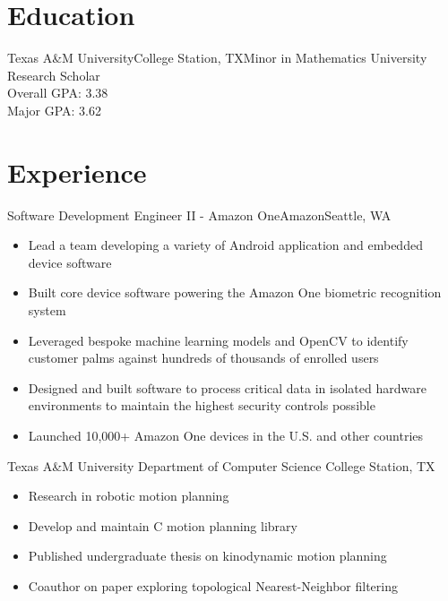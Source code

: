 \documentclass[11pt,a4paper,sans]{moderncv}
\newcommand{\Rplus}{\protect\hspace{-.1em}\protect\raisebox{.35ex}{\smaller{\smaller\textbf{+}}}}
\newcommand{\Cpp}{\mbox{C\Rplus\Rplus}\xspace}
\newcommand{\spacing}{4pt}
\begin{document}
\makecvtitle

\vspace{-1em}


\section{Education}

\vspace{\spacing}

    {Texas A\&M University}{College Station, TX}{Minor in Mathematics}
    {University Research Scholar \\ Overall GPA: 3.38 \\ Major GPA: 3.62}

\section{Experience}

\vspace{\spacing}

  {Software Development Engineer II - Amazon One}{Amazon}{Seattle, WA}{}
    {\vspace{3pt}
    \begin{itemize}
      \item Lead a team developing a variety of Android application and embedded device software
      \item Built core device software powering the Amazon One biometric recognition system
      \item Leveraged bespoke machine learning models and OpenCV to identify customer palms against hundreds of thousands of enrolled users
      \item Designed and built software to process critical data in isolated hardware environments to maintain the highest security controls possible
      \item Launched 10,000+ Amazon One devices in the U.S. and other countries
    \end{itemize}
    }

\vspace{\spacing}

  {Texas A\&M University Department of Computer Science}
    {College Station, TX}{}{\vspace{3pt}
    \begin{itemize}
      \item Research in robotic motion planning
      \item Develop and maintain \Cpp motion planning library
      \item Published undergraduate thesis on kinodynamic motion planning
      \item Coauthor on paper exploring topological Nearest-Neighbor filtering
    \end{itemize}
    }
\end{document}
